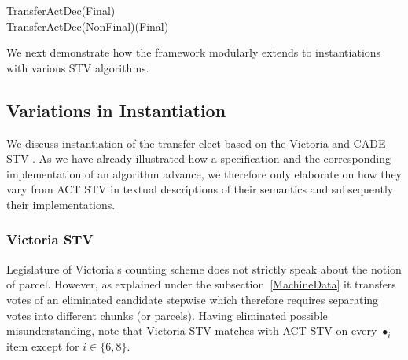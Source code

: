 \documentclass[10pt,conference]{IEEEtran}
\renewcommand{\HOLConst}[1]{{\textsf{\upshape #1}}}
\renewcommand{\HOLSymConst}[1]{\HOLConst{#1}}
\begin{document}
\begin{small}
\begin{holthmenv}
\HOLConst{TransferActDec}\;\;(\HOLConst{Final}\;)\;\;\HOLSymConst{\HOLTokenEquiv{}}\;\HOLConst{false}\\
\HOLConst{TransferActDec}\;\;(\HOLConst{NonFinal}\;)\;(\HOLConst{Final}\;)\;\HOLSymConst{\HOLTokenEquiv{}}\;\HOLConst{false}
\end{holthmenv}
\end{small}
We next demonstrate how the framework modularly extends to instantiations  with various STV algorithms.
\subsection{Variations in Instantiation}
We discuss instantiation of the transfer-elect  based on the Victoria and CADE STV \cite{cade}. As we have already illustrated how a specification and the corresponding implementation of an algorithm advance, we therefore only elaborate on how they vary from ACT STV in textual descriptions of their semantics and subsequently their implementations. 
\subsubsection{Victoria STV}
Legislature of Victoria's counting scheme does not strictly speak about the notion of parcel. However, as explained under the subsection~\ref{MachineData} it transfers votes of an eliminated candidate stepwise which therefore requires separating votes into different chunks (or parcels). Having eliminated possible misunderstanding, note that Victoria STV matches with ACT STV  on every $\bullet_{i}$ item except for $i\in\{6,8\}$.
\end{document}

